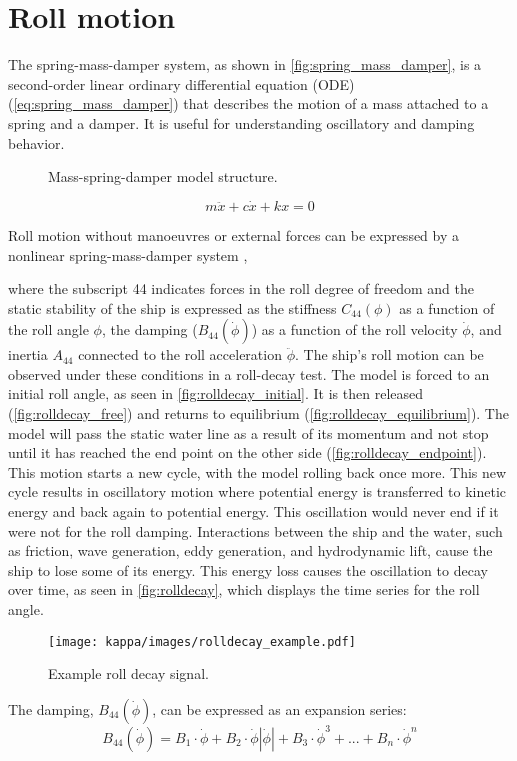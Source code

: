 \section{Roll motion} \label{sec:roll}
The spring-mass-damper system, as shown in \autoref{fig:spring_mass_damper}, is a second-order linear ordinary differential equation (ODE) (\autoref{eq:spring_mass_damper}) that describes the motion of a mass attached to a spring and a damper. It is useful for understanding oscillatory and damping behavior.
\begin{figure}[h]
    \centering
    
    \caption{Mass-spring-damper model structure.}
    \label{fig:spring_mass_damper}
\end{figure}
\begin{equation} \label{eq:spring_mass_damper}
m\ddot{x} + c\dot{x} + kx = 0
\end{equation}

Roll motion without manoeuvres or external forces can be expressed by a nonlinear spring-mass-damper system \cite{himenoPredictionShipRoll1981},

\noindent where the subscript 44 indicates forces in the roll degree of freedom and the static stability of the ship is expressed as the stiffness $C_{44}(\phi)$ as a function of the roll angle $\phi$, the damping ($B_{44}(\dot{\phi})$) as a function of the roll velocity $\dot{\phi}$, and inertia $A_{44}$ connected to the roll acceleration $\ddot{\phi}$. The ship's roll motion can be observed under these conditions in a roll-decay test. The model is forced to an initial roll angle, as seen in \autoref{fig:rolldecay_initial}. It is then released (\autoref{fig:rolldecay_free}) and returns to equilibrium (\autoref{fig:rolldecay_equilibrium}). The model will pass the static water line as a result of its momentum and not stop until it has reached the end point on the other side (\autoref{fig:rolldecay_endpoint}). This motion starts a new cycle, with the model rolling back
once more. This new cycle results in oscillatory motion where potential energy is transferred to kinetic energy and back again to potential energy.
This oscillation would never end if it were not for the roll damping. Interactions between the ship and the water, such as friction, wave generation, eddy generation, and hydrodynamic lift, cause the ship to lose some of its energy. This energy loss causes the oscillation to decay over time, as seen in \autoref{fig:rolldecay}, which displays the time series for the roll angle.

\begin{figure}[H]
    \centering
    \texttt{[image: kappa/images/rolldecay\_example.pdf]}
    \caption{Example roll decay signal.}
    \label{fig:rolldecay}
\end{figure}
The damping, $B_{44}\left(\dot{\phi}\right)$, can be expressed as an expansion series:  
\begin{equation}
    B_{44}\left(\dot{\phi}\right) = B_1\cdot\dot{\phi} + B_2\cdot\dot{\phi}\left|\dot{\phi}\right| + B_3\cdot\dot{\phi}^3 + ... + B_n\cdot\dot{\phi}^n
\end{equation}
 

